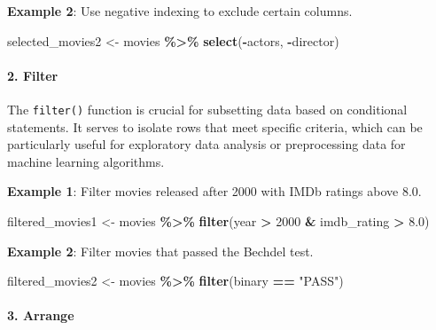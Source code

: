 \documentclass[
]{book}
\newenvironment{Shaded}{\begin{snugshade}}{\end{snugshade}}
\newcommand{\DecValTok}[1]{\textcolor[rgb]{0.00,0.00,0.81}{#1}}
\newcommand{\FloatTok}[1]{\textcolor[rgb]{0.00,0.00,0.81}{#1}}
\newcommand{\FunctionTok}[1]{\textcolor[rgb]{0.13,0.29,0.53}{\textbf{#1}}}
\newcommand{\NormalTok}[1]{#1}
\newcommand{\OtherTok}[1]{\textcolor[rgb]{0.56,0.35,0.01}{#1}}
\newcommand{\SpecialCharTok}[1]{\textcolor[rgb]{0.81,0.36,0.00}{\textbf{#1}}}
\newcommand{\StringTok}[1]{\textcolor[rgb]{0.31,0.60,0.02}{#1}}
\begin{document}
\textbf{Example 2}: Use negative indexing to exclude certain columns.

\begin{Shaded}
\begin{Highlighting}[]
\NormalTok{selected\_movies2 }\OtherTok{\textless{}{-}}\NormalTok{ movies }\SpecialCharTok{\%\textgreater{}\%}
  \FunctionTok{select}\NormalTok{(}\SpecialCharTok{{-}}\NormalTok{actors, }\SpecialCharTok{{-}}\NormalTok{director)}
\end{Highlighting}
\end{Shaded}

\paragraph*{2. Filter}\label{filter}

The \texttt{filter()} function is crucial for subsetting data based on conditional statements. It serves to isolate rows that meet specific criteria, which can be particularly useful for exploratory data analysis or preprocessing data for machine learning algorithms.

\textbf{Example 1}: Filter movies released after 2000 with IMDb ratings above 8.0.

\begin{Shaded}
\begin{Highlighting}[]
\NormalTok{filtered\_movies1 }\OtherTok{\textless{}{-}}\NormalTok{ movies }\SpecialCharTok{\%\textgreater{}\%}
  \FunctionTok{filter}\NormalTok{(year }\SpecialCharTok{\textgreater{}} \DecValTok{2000} \SpecialCharTok{\&}\NormalTok{ imdb\_rating }\SpecialCharTok{\textgreater{}} \FloatTok{8.0}\NormalTok{)}
\end{Highlighting}
\end{Shaded}

\textbf{Example 2}: Filter movies that passed the Bechdel test.

\begin{Shaded}
\begin{Highlighting}[]
\NormalTok{filtered\_movies2 }\OtherTok{\textless{}{-}}\NormalTok{ movies }\SpecialCharTok{\%\textgreater{}\%}
  \FunctionTok{filter}\NormalTok{(binary }\SpecialCharTok{==} \StringTok{"PASS"}\NormalTok{)}
\end{Highlighting}
\end{Shaded}

\paragraph*{3. Arrange}\label{arrange}
\end{document}

